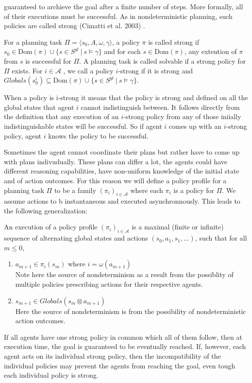  guaranteed to archieve the goal after a finite number of steps. More formally, all of their executions must be successful. As in nondeterministic planning, such policies are called strong (Cimatti et al. 2003) .

For a planning task $\Pi = \langle s_0, A, \omega, \gamma \rangle$, a policy $\pi$ is called strong if $s_0 \in \text{Dom}(\pi) \cup \{s \in S^{gl} ~|~ s \models \gamma\}$ and for each $s \in \text{Dom}(\pi)$, any extention of $\pi$ from $s$ is successful for $\Pi$. A planning task is called solvable if a strong policy for $\Pi$ exists.
For $ i \in \mathcal{A} $ , we call a policy $i$-strong if it is strong and  $Globals(s_0^i ) \subseteq \text{Dom}(\pi) \cup\{ s \in S^{gl} ~|~ s \models \gamma \}$.

When a policy is i-strong it means that the policy is strong and defined on all the global states that agent $i$ cannot indistinguish between. It follows directly from the definition that any execution of an $i$-strong policy from any of those iniially indistinguishable states will be successful. So if agent $i$ comes up with an $i$-strong policy, agent $i$ knows the policy to be successful.

Sometimes the agent cannot coordinate their plans but rather have to come up with plans indivudually. These plans can differ a lot, the agents could have different reasoning capabilities, have non-uniform knowledge of the initial state and of action outcomes. For this reason we will define a policy profile for a planning task $\Pi$ to be a family $(\pi_i)_{i \in \mathcal{A}}$ where each $\pi_i$ is a policy for $\Pi$. We assume actions to b instantaneous and executed asynchronnously. This leads to the following generalization:

An execution of a policy profile $(\pi_i)_{i \in \mathcal{A}}$ is a maximal (finite or infinite) sequence of alternating global states and actions $(s_0, a_1, s_1,...)$, such that for all $m \leq 0$,
\begin{enumerate}
  \item $a_{m+1} \in \pi_i(s_m)$ where $i=\omega(a_{m+1})$ \\
    Note here the source of nondeterminism as a result from the possiblity of multiple policies prescribing actions for their respective agents.
  \item $s_{m+1} \in Globals(s_m \otimes a_{m+1}) $ \\
    Here the source of nondeterminism is from the possibility of nondeterministic action outcomes.
\end{enumerate}


If all agents have one strong policy in common which all of them follow, then at execution time, the goal is guaranteed to be eventually reached. If, however, each agent acts on its individual strong policy, then the incompatibility of the individual policies may prevent the agents from reaching the goal, even tough each individual policy is strong.
